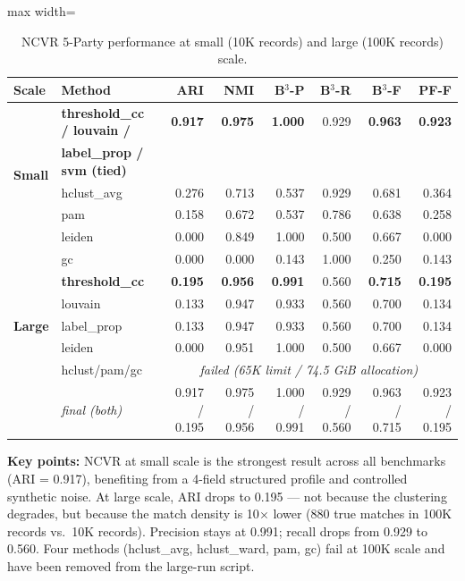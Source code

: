 \documentclass[11pt, a4paper]{article}
\newcommand{\good}[1]{{\color{good}\textbf{#1}}}
\begin{document}
\begin{table}[h!]
\centering
\small
\begin{adjustbox}{max width=\linewidth}
\begin{tabular}{llrrrrrr}
\toprule
\textbf{Scale} & \textbf{Method} & \textbf{ARI} & \textbf{NMI} & \textbf{B$^3$-P} &
\textbf{B$^3$-R} & \textbf{B$^3$-F} & \textbf{PF-F} \\
\midrule
\multirow{5}{*}{\textbf{Small}}
 & \good{threshold\_cc / louvain /} & \good{0.917} & \good{0.975} & \good{1.000} & 0.929 & \good{0.963} & \good{0.923} \\
 & \good{\quad label\_prop / svm (tied)} & & & & & & \\
 & hclust\_avg & 0.276 & 0.713 & 0.537 & 0.929 & 0.681 & 0.364 \\
 & pam         & 0.158 & 0.672 & 0.537 & 0.786 & 0.638 & 0.258 \\
 & leiden      & 0.000 & 0.849 & 1.000 & 0.500 & 0.667 & 0.000 \\
 & gc          & 0.000 & 0.000 & 0.143 & 1.000 & 0.250 & 0.143 \\
\midrule
\multirow{5}{*}{\textbf{Large}}
 & \good{threshold\_cc} & \good{0.195} & \good{0.956} & \good{0.991} & 0.560 & \good{0.715} & \good{0.195} \\
 & louvain     & 0.133 & 0.947 & 0.933 & 0.560 & 0.700 & 0.134 \\
 & label\_prop & 0.133 & 0.947 & 0.933 & 0.560 & 0.700 & 0.134 \\
 & leiden      & 0.000 & 0.951 & 1.000 & 0.500 & 0.667 & 0.000 \\
 & hclust/pam/gc & \multicolumn{6}{c}{\textit{failed (65K limit / 74.5 GiB allocation)}} \\
\midrule
\multirow{1}{*}{}
 & \textit{final (both)} & 0.917 / 0.195 & 0.975 / 0.956 & 1.000 / 0.991 & 0.929 / 0.560 & 0.963 / 0.715 & 0.923 / 0.195 \\
\bottomrule
\end{tabular}
\end{adjustbox}
\caption{NCVR 5-Party performance at small (10K records) and large (100K records) scale.}
\end{table}

\textbf{Key points:} NCVR at small scale is the strongest result across all
benchmarks (ARI = 0.917), benefiting from a 4-field structured profile and
controlled synthetic noise. At large scale, ARI drops to 0.195 --- not because
the clustering degrades, but because the match density is 10$\times$ lower
(880 true matches in 100K records vs.\ 10K records). Precision stays at 0.991;
recall drops from 0.929 to 0.560. Four methods (hclust\_avg, hclust\_ward, pam,
gc) fail at 100K scale and have been removed from the large-run script.
\end{document}

